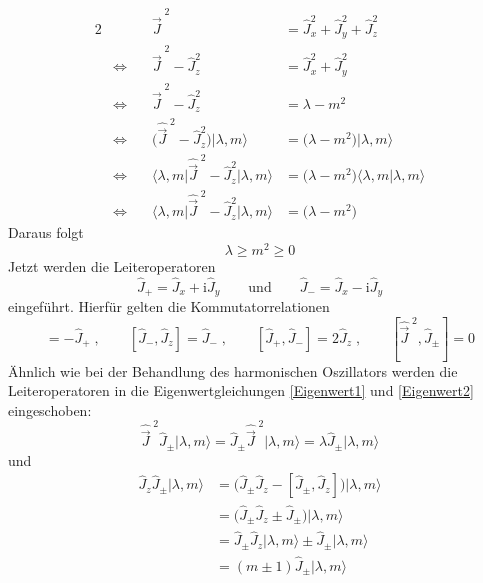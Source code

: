 \documentclass[9pt]{report}
\begin{document}
\begin{alignat*}{2}
&\qquad           & \hat{\vec{J}}^{\;2} &= \hat{J}_{x}^{2}+\hat{J}_{y}^{2}+\hat{J}_{z}^{2}         \\
&\Leftrightarrow     &  \hat{\vec{J}}^{\;2}-\hat{J}_{z}^{2}     &= \hat{J}_{x}^{2}+\hat{J}_{y}^{2}        \\
&\Leftrightarrow  & \hat{\vec{J}}^{\;2}-\hat{J}_{z}^{2} &=          \lambda -m^2\\
&\Leftrightarrow  & \big(\hat{\vec{J}}^{\;2}-\hat{J}_{z}^{2}\big)\big|\lambda,m\big\rangle &= \big(\lambda-m^2\big)\big|\lambda,m\big\rangle         \\
&\Leftrightarrow     &  \big\langle\lambda,m\big|\hat{\vec{J}}^{\;2}-\hat{J}_{z}^{2}\big|\lambda,m\big\rangle     &=  \big(\lambda-m^2\big)\langle\lambda,m|\lambda,m\rangle \\
&\Leftrightarrow     &  \big\langle\lambda,m\big|\hat{\vec{J}}^{\;2}-\hat{J}_{z}^{2}\big|\lambda,m\big\rangle    &=    \big(\lambda-m^2\big)
\end{alignat*}
Daraus folgt
\begin{equation}
\lambda\geq m^2\geq 0\label{Abbruchbedingung}
\end{equation}
Jetzt werden die Leiteroperatoren
\begin{equation}
\hat{J}_{+}=\hat{J}_{x}+\mathrm{i}\hat{J}_{y}\qquad\mathrm{und}\qquad\hat{J}_{-}=\hat{J}_{x}-\mathrm{i}\hat{J}_{y}
\end{equation}
eingeführt. Hierfür gelten die Kommutatorrelationen
\begin{equation}
[\hat{J}_{+},\hat{J}_{z}]=-\hat{J}_{+}\;,\qquad [\hat{J}_{-},\hat{J}_{z}]=\hat{J}_{-}\;,\qquad [\hat{J}_{+},\hat{J}_{-}]=2\hat{J}_{z}\;,\qquad [\hat{\vec{J}}^{\;2},\hat{J}_{\pm}]=0
\end{equation}
Ähnlich wie bei der Behandlung des harmonischen Oszillators werden die Leiteroperatoren in die Eigenwertgleichungen \eqref{Eigenwert1} und \eqref{Eigenwert2} eingeschoben:
\begin{equation}
\hat{\vec{J}}^{\;2}\hat{J}_{\pm}\big|\lambda,m\big\rangle = \hat{J}_{\pm}\hat{\vec{J}}^{\;2}\big|\lambda,m\big\rangle = \lambda\hat{J}_{\pm}\big|\lambda,m\big\rangle
\end{equation}
und
\begin{align}
\hat{J}_{z}\hat{J}_{\pm}\big|\lambda,m\big\rangle &= \big(\hat{J}_{\pm}\hat{J}_{z}-[\hat{J}_{\pm},\hat{J}_{z}]\big)\big|\lambda,m\rangle\\
&= \big(\hat{J}_{\pm}\hat{J}_{z}\pm\hat{J}_{\pm}\big)\big|\lambda,m\rangle\\
&= \hat{J}_{\pm}\hat{J}_{z}\big|\lambda,m\big\rangle\pm\hat{J}_{\pm}\big|\lambda,m\big\rangle\\
&= (m\pm 1)\hat{J}_{\pm}\big|\lambda,m\big\rangle
\end{align}
\end{document}
